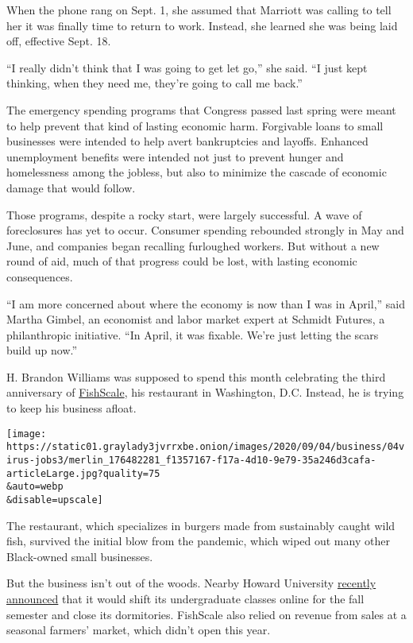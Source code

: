 When the phone rang on Sept. 1, she assumed that Marriott was calling to
tell her it was finally time to return to work. Instead, she learned she
was being laid off, effective Sept. 18.

``I really didn't think that I was going to get let go,'' she said. ``I
just kept thinking, when they need me, they're going to call me back.''

The emergency spending programs that Congress passed last spring were
meant to help prevent that kind of lasting economic harm. Forgivable
loans to small businesses were intended to help avert bankruptcies and
layoffs. Enhanced unemployment benefits were intended not just to
prevent hunger and homelessness among the jobless, but also to minimize
the cascade of economic damage that would follow.

Those programs, despite a rocky start, were largely successful. A wave
of foreclosures has yet to occur. Consumer spending rebounded strongly
in May and June, and companies began recalling furloughed workers. But
without a new round of aid, much of that progress could be lost, with
lasting economic consequences.

``I am more concerned about where the economy is now than I was in
April,'' said Martha Gimbel, an economist and labor market expert at
Schmidt Futures, a philanthropic initiative. ``In April, it was fixable.
We're just letting the scars build up now.''

H. Brandon Williams was supposed to spend this month celebrating the
third anniversary of \href{https://www.wearefishscale.com/}{FishScale},
his restaurant in Washington, D.C. Instead, he is trying to keep his
business afloat.

\texttt{[image: https://static01.graylady3jvrrxbe.onion/images/2020/09/04/business/04virus-jobs3/merlin\_176482281\_f1357167-f17a-4d10-9e79-35a246d3cafa-articleLarge.jpg?quality=75\\\&auto=webp\\\&disable=upscale]}

The restaurant, which specializes in burgers made from sustainably
caught wild fish, survived the initial blow from the pandemic, which
wiped out many other Black-owned small businesses.

But the business isn't out of the woods. Nearby Howard University
\href{https://home.howard.edu/reopen}{recently announced} that it would
shift its undergraduate classes online for the fall semester and close
its dormitories. FishScale also relied on revenue from sales at a
seasonal farmers' market, which didn't open this year.

